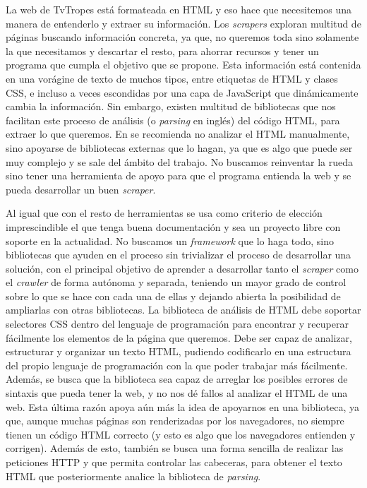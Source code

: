 La web de TvTropes está formateada en HTML y eso hace que necesitemos una manera
de entenderlo y extraer su información. Los \textit{scrapers} exploran multitud
de páginas buscando información concreta, ya que, no queremos toda sino
solamente la que necesitamos y descartar el resto, para ahorrar recursos y tener
un programa que cumpla el objetivo que se propone. Esta información está
contenida en una vorágine de texto de muchos tipos, entre etiquetas de HTML y
clases CSS, e incluso a veces escondidas por una capa de JavaScript que
dinámicamente cambia la información. Sin embargo, existen multitud de
bibliotecas que nos facilitan este proceso de análisis (o \textit{parsing} en
inglés) del código HTML, para extraer lo que queremos. En
\cite{apress2018scraping} se recomienda no analizar el HTML manualmente, sino
apoyarse de bibliotecas externas que lo hagan, ya que es algo que puede ser muy
complejo y se sale del ámbito del trabajo. No buscamos reinventar la rueda sino
tener una herramienta de apoyo para que el programa entienda la web y se pueda
desarrollar un buen \textit{scraper}.

Al igual que con el resto de herramientas se usa como criterio de elección
imprescindible el que tenga buena documentación y sea un proyecto libre con
soporte en la actualidad. No buscamos un \textit{framework} que lo haga todo,
sino bibliotecas que ayuden en el proceso sin trivializar el proceso de
desarrollar una solución, con el principal objetivo de aprender a desarrollar
tanto el \textit{scraper} como el \textit{crawler} de forma autónoma y separada,
teniendo un mayor grado de control sobre lo que se hace con cada una de ellas y
dejando abierta la posibilidad de ampliarlas con otras bibliotecas. La
biblioteca de análisis de HTML debe soportar selectores CSS dentro del lenguaje
de programación para encontrar y recuperar fácilmente los elementos de la página
que queremos. Debe ser capaz de analizar, estructurar y organizar un texto HTML,
pudiendo codificarlo en una estructura del propio lenguaje de programación con
la que poder trabajar más fácilmente. Además, se busca que la biblioteca sea
capaz de arreglar los posibles errores de sintaxis que pueda tener la web, y no
nos dé fallos al analizar el HTML de una web. Esta última razón apoya aún más la
idea de apoyarnos en una biblioteca, ya que, aunque muchas páginas son
renderizadas por los navegadores, no siempre tienen un código HTML correcto (y
esto es algo que los navegadores entienden y corrigen). Además de esto, también
se busca una forma sencilla de realizar las peticiones HTTP y que permita
controlar las cabeceras, para obtener el texto HTML que posteriormente analice
la biblioteca de \textit{parsing}.


